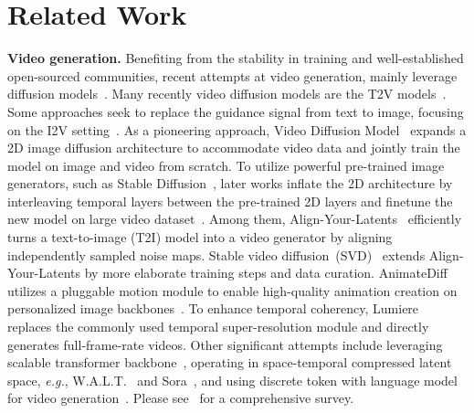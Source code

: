 \section{Related Work}\label{sec:related_work}
\noindent \textbf{Video generation.}
%
Benefiting from the stability in training and well-established open-sourced communities, recent attempts at video generation, mainly leverage diffusion models~\citep{ho2020denoising, song2020denoising, peebles2023scalable}.
% 
Many recently video diffusion models are the T2V models~\citep{karras2023dreampose, ruan2023mm, zhang2023i2vgen, latentvideodiffusion, chen2023videocrafter1, hong2022cogvideo, yang2024cogvideox}.
%
Some approaches seek to replace the guidance signal from text to image, focusing on the I2V setting~\citep{mcdiff, chen2023seine, esser2023structure}.
%
As a pioneering approach, Video Diffusion Model~\citep{ho2022video} expands a 2D image diffusion architecture to accommodate video data and jointly train the model on image and video from scratch.
% 
To utilize powerful pre-trained image generators, such as Stable Diffusion~\citep{ldm}, later works inflate the 2D architecture by interleaving temporal layers between the pre-trained 2D layers and finetune the new model on large video dataset~\citep{webvid10m}.
% 
Among them, Align-Your-Latents~\citep{alignyourlatents} efficiently turns a text-to-image (T2I) model into a video generator by aligning independently sampled noise maps.
%
Stable video diffusion~(SVD)~\citep{svd} extends Align-Your-Latents by more elaborate training steps and data curation.
%
AnimateDiff~\citep{animatediff} utilizes a pluggable motion module to enable high-quality animation creation on personalized image backbones~\citep{dreambooth}.
% 
To enhance temporal coherency, Lumiere~\citep{bar2024lumiere} replaces the commonly used temporal super-resolution module and directly generates full-frame-rate videos.
% 
Other significant attempts include leveraging scalable transformer backbone~\citep{ma2024latte}, operating in space-temporal compressed latent space, \emph{e.g.}, W.A.L.T.~\citep{gupta2023photorealistic} and Sora~\citep{videoworldsimulators2024}, and using discrete token with language model for video generation~\citep{kondratyuk2023videopoet}. Please see~\citep{Po:2023:star_diffusion_models} for a comprehensive survey.

